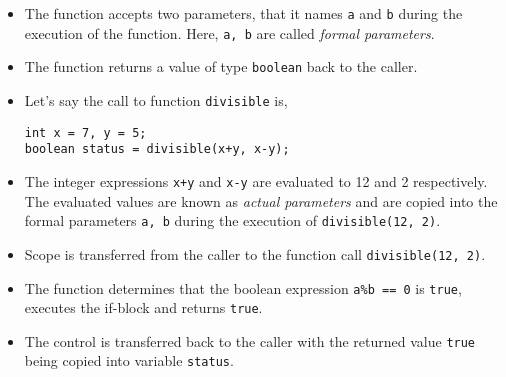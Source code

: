 \documentclass[abstracton]{scrartcl}
\begin{document}
\begin{itemize}
	\item The function accepts two parameters, that it names \texttt{a} and \texttt{b} during the execution of the function. Here, \texttt{a, b} are called \textit{formal parameters}.
	\item The function returns a value of type \texttt{boolean} back to the caller.
	\item Let's say the call to function \texttt{divisible} is,

\begin{lstlisting}
int x = 7, y = 5;
boolean status = divisible(x+y, x-y);
\end{lstlisting}

	\item The integer expressions \texttt{x+y}  and \texttt{x-y} are evaluated to 12 and 2 respectively. The evaluated values are known as \textit{actual parameters} and are copied into the formal parameters \texttt{a, b} during the execution of \texttt{divisible(12, 2)}.
	
	\item Scope is transferred from the caller to the function call \texttt{divisible(12, 2)}. 
	
	\item The function determines that the boolean expression \texttt{a\%b == 0} is \texttt{true}, executes the if-block and returns \texttt{true}.
	
	\item The control is transferred back to the caller with the returned value \texttt{true} being copied into variable \texttt{status}.
\end{itemize}

\bgroup \tikzset{png export}  \egroup

\bgroup \tikzset{png export}  \egroup
\end{document}
